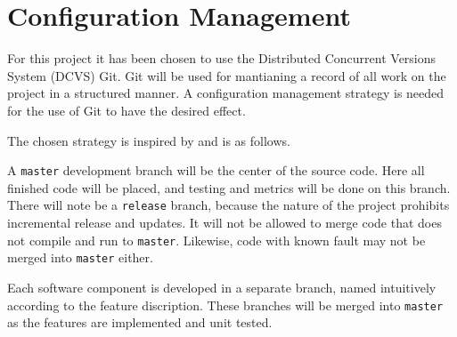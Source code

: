 \documentclass[Main_Assignment3]{subfiles}
\begin{document}
	\section{Configuration Management} %
		\label{sec:configuration_management}
		For this project it has been chosen to use the Distributed Concurrent Versions System (DCVS) Git.
		Git will be used for mantianing a record of all work on the project in a structured manner.
		A configuration management strategy is needed for the use of Git to have the desired effect.

		The chosen strategy is inspired by \cite{vincentdriessen2010} and is as follows.

		A \texttt{master} development branch will be the center of the source code. Here all finished code will be placed, and testing and metrics will be done on this branch.
		There will note be a \texttt{release} branch, because the nature of the project prohibits incremental release and updates.
		It will not be allowed to merge code that does not compile and run to \texttt{master}.
		Likewise, code with known fault may not be merged into \texttt{master} either.

		Each software component is developed in a separate branch, named intuitively according to the feature discription.
		These branches will be merged into \texttt{master} as the features are implemented and unit tested.

\end{document}
